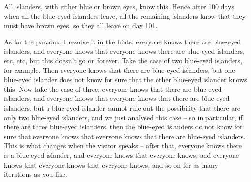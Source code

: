 \documentclass[10pt]{article}
\begin{document}
All islanders, with either blue or brown eyes, know this. Hence after 100 days when all the blue-eyed islanders leave, all the remaining islanders know that they must have brown eyes, so they all leave on day 101.

As for the paradox, I resolve it in the hints: everyone knows there are blue-eyed islanders, and everyone knows that everyone knows there are blue-eyed islanders, etc, etc, but this doesn't go on forever. Take the case of two blue-eyed islanders, for example. Then everyone knows that there are blue-eyed islanders, but one blue-eyed islander does not know for sure that the other blue-eyed islander knows this. Now take the case of three: everyone knows that there are blue-eyed islanders, and everyone knows that everyone knows that there are blue-eyed islanders, but a blue-eyed islander cannot rule out the possibility that there are only two blue-eyed islanders, and we just analysed this case -- so in particular, if there are three blue-eyed islanders, then the blue-eyed islanders do not know for sure that everyone knows that everyone knows that there are blue-eyed islanders. This is what changes when the visitor speaks -- after that, everyone knows there is a blue-eyed islander, and everyone knows that everyone knows, and everyone knows that everyone knows that everyone knows, and so on for as many iterations as you like.
\end{document}
